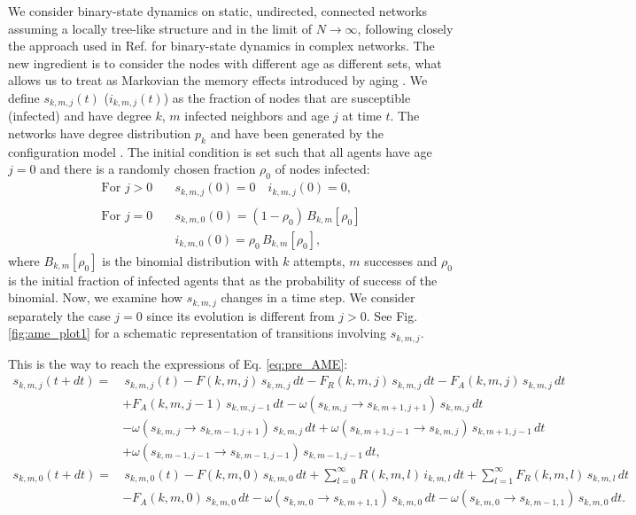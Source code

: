     We consider  binary-state dynamics on static, undirected, connected networks assuming a locally tree-like structure and in the limit of $N \to \infty$, following closely the approach used in Ref. \cite{gleeson-2013} for binary-state dynamics in complex networks. The new ingredient  is to consider the nodes with different age as different sets, what allows us to treat as Markovian the memory effects introduced by aging \cite{peralta-2020C,peralta-2020A}. We define $s_{k,m,j} (t)$ ($i_{k,m,j} (t)$) as the fraction of nodes that are susceptible (infected) and have degree $k$, $m$ infected neighbors and age $j$ at time $t$. The networks have degree distribution $p_k$ and have been generated by the configuration model \cite{molloy-1995,newman-2001}. The initial condition is set such that all agents have age $j = 0$ and there is a randomly chosen fraction $\rho_0$ of nodes infected:
    \begin{align} \label{initial_condition} 
    \textrm{For } j > 0 & \quad    s_{k,m,j} (0) = 0  \quad   i_{k,m,j} (0) = 0, \nonumber\\
    \\
    \textrm{For } j = 0 & \quad    s_{k,m,0} (0) = (1 -  \rho_0)\, B_{k,m}[\rho_0] \nonumber \\
                        & \quad    i_{k,m,0} (0) = \rho_0\, B_{k,m}[\rho_0], \nonumber
    \end{align}
    where $B_{k,m}[\rho_0]$ is the binomial distribution with $k$ attempts, $m$ successes and $\rho_0$ is the initial fraction of infected agents that as the probability of success of the binomial. Now, we examine how $s_{k,m,j}$ changes in a time step. We consider separately the case $j = 0$ since its evolution is different from $j > 0$. See Fig. \ref{fig:ame_plot1} for a schematic representation of transitions involving $s_{k,m,j}$.
    
    This is the way to reach the expressions of Eq. \eqref{eq:pre_AME}:
    \begin{align} \label{eq:pre_AME}
        s_{k,m,j} (t + dt) = & \, s_{k,m,j}(t) - F (k,m,j)\, s_{k,m,j}\, dt - F_{R} (k,m,j)\, s_{k,m,j} \, dt - F_{A} (k,m,j) \, s_{k,m,j} \, dt \nonumber \\
        & + F_{A} (k,m,j-1)\,  s_{k,m,j-1} \, dt - \omega (s_{k,m,j} \to s_{k,m+1,j+1}) \, s_{k,m,j}\, dt  \nonumber \\
        & - \omega (s_{k,m,j} \to s_{k,m-1,j+1})\,  s_{k,m,j} \, dt + \omega (s_{k,m+1,j-1} \to s_{k,m,j}) \, s_{k,m+1,j-1} \, dt \nonumber \\
        & + \omega (s_{k,m-1,j-1} \to s_{k,m-1,j-1}) \, s_{k,m-1,j-1}\,  dt, \\
        s_{k,m,0} (t + dt) = &\,  s_{k,m,0}(t) - F (k,m,0) \, s_{k,m,0} \, dt + \sum_{l = 0}^{\infty} R (k,m,l)\,  i_{k,m,l} \, dt + \sum_{l = 1}^{\infty} F_{R} (k,m,l)\,  s_{k,m,l}\,  dt   \nonumber\\
        & - F_{A} (k,m,0)\,  s_{k,m,0}\,  dt - \omega (s_{k,m,0} \to s_{k,m+1,1}) \, s_{k,m,0}\,  dt - \omega (s_{k,m,0} \to s_{k,m-1,1})\,  s_{k,m,0} \, dt .\nonumber
    \end{align}
    
